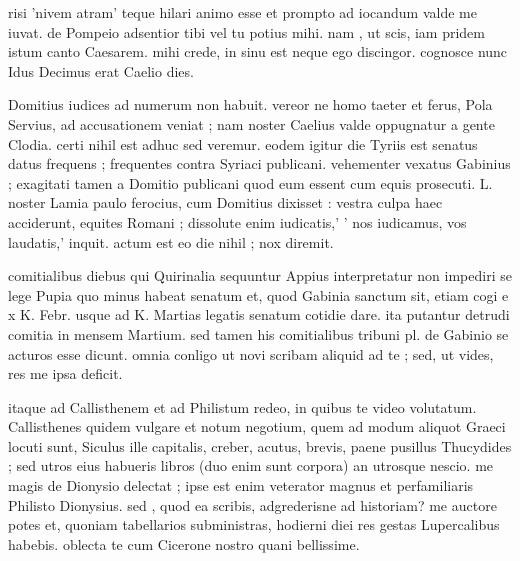 


 risi 'nivem atram' teque hilari animo esse et prompto ad iocandum valde me iuvat. de Pompeio adsentior tibi vel tu potius mihi. nam , ut scis, iam pridem istum canto Caesarem. mihi crede, in sinu est neque ego discingor. cognosce nunc Idus Decimus erat Caelio dies.

 Domitius iudices ad numerum non habuit. vereor ne homo taeter et ferus, Pola Servius, ad accusationem veniat ; nam noster Caelius valde oppugnatur a gente Clodia. certi nihil est adhuc sed veremur. eodem igitur die Tyriis est senatus datus frequens ; frequentes contra Syriaci publicani. vehementer vexatus Gabinius ; exagitati tamen a Domitio publicani quod eum essent cum equis prosecuti. L. noster Lamia paulo ferocius, cum Domitius dixisset : vestra culpa haec acciderunt, equites Romani ; dissolute enim iudicatis,' ' nos iudicamus, vos laudatis,' inquit. actum est eo die nihil ; nox diremit.

 comitialibus diebus qui Quirinalia sequuntur Appius interpretatur non impediri se lege Pupia quo minus habeat senatum et, quod Gabinia sanctum sit, etiam cogi e x K. Febr. usque ad K. Martias legatis senatum cotidie dare. ita putantur detrudi comitia in mensem Martium. sed tamen his comitialibus tribuni pl. de Gabinio se acturos esse dicunt. omnia conligo ut novi scribam aliquid ad te ; sed, ut vides, res me ipsa deficit.

 itaque ad Callisthenem et ad Philistum redeo, in quibus te video volutatum. Callisthenes quidem vulgare et notum negotium, quem ad modum aliquot Graeci locuti sunt, Siculus ille capitalis, creber, acutus, brevis, paene pusillus Thucydides ; sed utros eius habueris libros (duo enim sunt corpora) an utrosque nescio. me magis de Dionysio delectat ; ipse est enim veterator magnus et perfamiliaris Philisto Dionysius. sed , quod ea scribis, adgrederisne ad historiam? me auctore potes et, quoniam tabellarios subministras, hodierni diei res gestas Lupercalibus habebis. oblecta te cum Cicerone nostro quani bellissime.
